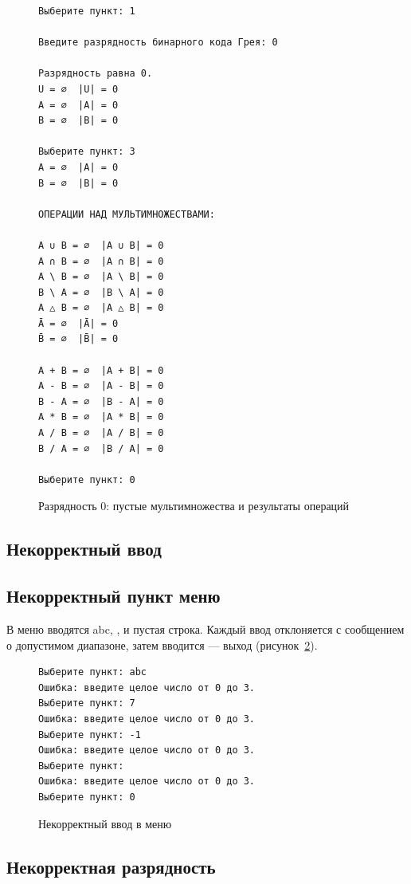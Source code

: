\documentclass[14pt,a4paper]{extarticle}
\newcommand{\codefont}{\renewcommand{\baselinestretch}{1}\monofont\fontsize{10}{12}\selectfont}
\newcommand{\code}[1]{{\monofont #1}}
\begin{document}
\begin{figure}[H]
\begin{Verbatim}[frame=single,framesep=4pt,breaklines=true,formatcom=\codefont]
Выберите пункт: 1

Введите разрядность бинарного кода Грея: 0

Разрядность равна 0.
U = ∅  |U| = 0
A = ∅  |A| = 0
B = ∅  |B| = 0

Выберите пункт: 3
A = ∅  |A| = 0
B = ∅  |B| = 0

ОПЕРАЦИИ НАД МУЛЬТИМНОЖЕСТВАМИ:

A ∪ B = ∅  |A ∪ B| = 0
A ∩ B = ∅  |A ∩ B| = 0
A \ B = ∅  |A \ B| = 0
B \ A = ∅  |B \ A| = 0
A △ B = ∅  |A △ B| = 0
Ā = ∅  |Ā| = 0
B̄ = ∅  |B̄| = 0

A + B = ∅  |A + B| = 0
A - B = ∅  |A - B| = 0
B - A = ∅  |B - A| = 0
A * B = ∅  |A * B| = 0
A / B = ∅  |A / B| = 0
B / A = ∅  |B / A| = 0

Выберите пункт: 0
\end{Verbatim}
\caption{Разрядность 0: пустые мультимножества и результаты операций}\label{fig:bits0}
\end{figure}

\subsection*{Некорректный ввод}

\subsection{Некорректный пункт меню}

В меню вводятся \code{abc}, \code{7}, \code{-1} и пустая строка. Каждый ввод отклоняется с сообщением о допустимом диапазоне, затем вводится \code{0} --- выход (рисунок~\ref{fig:badmenu}).

\begin{figure}[H]
\begin{Verbatim}[frame=single,framesep=4pt,breaklines=true,formatcom=\codefont]
Выберите пункт: abc
Ошибка: введите целое число от 0 до 3.
Выберите пункт: 7
Ошибка: введите целое число от 0 до 3.
Выберите пункт: -1
Ошибка: введите целое число от 0 до 3.
Выберите пункт: 
Ошибка: введите целое число от 0 до 3.
Выберите пункт: 0
\end{Verbatim}
\caption{Некорректный ввод в меню}\label{fig:badmenu}
\end{figure}

\subsection{Некорректная разрядность}
\end{document}
